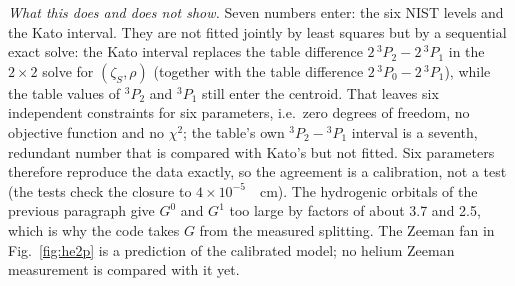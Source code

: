 \emph{What this does and does not show.} Seven numbers enter: the six NIST levels and the Kato interval. They are not fitted jointly by least squares but by a sequential exact solve: the Kato interval replaces the table difference $2\,^3P_2-2\,^3P_1$ in the $2\times2$ solve for $(\zeta_S,\rho)$ (together with the table difference $2\,^3P_0-2\,^3P_1$), while the table values of $^3P_2$ and $^3P_1$ still enter the centroid. That leaves six independent constraints for six parameters, i.e.\ zero degrees of freedom, no objective function and no $\chi^2$; the table's own $^3P_2-{}^3P_1$ interval is a seventh, redundant number that is compared with Kato's but not fitted. Six parameters therefore reproduce the data exactly, so the agreement is a calibration, not a test (the tests check the closure to $4\times10^{-5}$~\si{\per\centi\metre}). The hydrogenic orbitals of the previous paragraph give $G^0$ and $G^1$ too large by factors of about 3.7 and 2.5, which is why the code takes $G$ from the measured splitting. The Zeeman fan in Fig.~\ref{fig:he2p} is a prediction of the calibrated model; no helium Zeeman measurement is compared with it yet.

